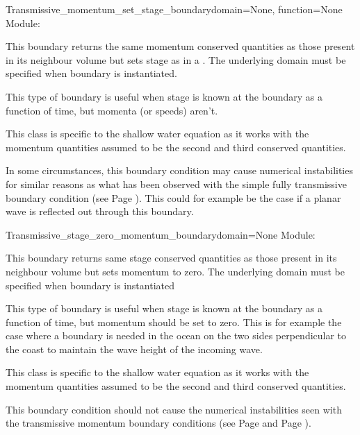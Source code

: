 \documentclass{manual}
\begin{document}
\begin{classdesc}{Transmissive_momentum_set_stage_boundary}{domain=None,
                                                            function=None}
Module: 
\label{pg: transmissive momentum set stage boundary}

This boundary returns the same momentum conserved quantities as
those present in its neighbour volume but sets stage as in a .
The underlying domain must be specified when boundary is instantiated.

This type of boundary is useful when stage is known at the boundary as a
function of time, but momenta (or speeds) aren't.

This class is specific to the shallow water equation as it works with the
momentum quantities assumed to be the second and third conserved quantities.

In some circumstances, this boundary condition may cause numerical instabilities for similar
reasons as what has been observed with the simple fully transmissive boundary condition
(see Page \pageref{pg: transmissive boundary}). 
This could for example be the case if a planar wave is reflected out through this boundary.
\end{classdesc}

\begin{classdesc}{Transmissive_stage_zero_momentum_boundary}{domain=None}
Module: 
\label{pg: transmissive stage zero momentum boundary}

This boundary returns same stage conserved quantities as
those present in its neighbour volume but sets momentum to zero.
The underlying domain must be specified when boundary is instantiated

This type of boundary is useful when stage is known at the boundary as a
function of time, but momentum should be set to zero. This is for example
the case where a boundary is needed in the ocean on the two sides perpendicular
to the coast to maintain the wave height of the incoming wave.

This class is specific to the shallow water equation as it works with the
momentum quantities assumed to be the second and third conserved quantities.

This boundary condition should not cause the numerical instabilities seen with the transmissive momentum 
boundary conditions (see Page \pageref{pg: transmissive boundary} and
Page \pageref{pg: transmissive momentum set stage boundary}).
\end{classdesc}
\end{document}
